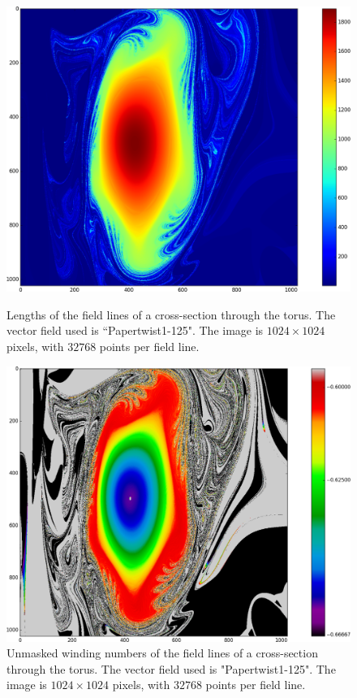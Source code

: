 \documentclass{article}
\begin{document}
\begin{figure}[!htb]
  \includegraphics[width=\linewidth]{Figures/Rings_Papertwist_twist1_125_lengths_steps32k.png}
  \caption{Lengths of the field lines of a cross-section through the torus. The vector field used is ``Papertwist1-125". The image is $1024\times 1024$ pixels, with $32768$ points per field line.}\label{fig:125-lengths}
\endminipage\hfill
{}
  \includegraphics[width=\linewidth]{Figures/Rings_Papertwist_twist1_125_nomask_steps32k.png}
  \caption{Unmasked winding numbers of the field lines of a cross-section through the torus. The vector field used is "Papertwist1-125". The image is $1024\times 1024$ pixels, with $32768$ points per field line.}\label{fig:125-unmasked}

\end{figure}
\end{document}
